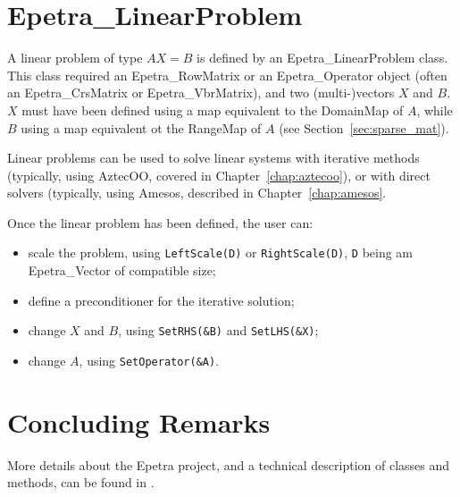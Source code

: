 
\section{Epetra\_LinearProblem}
\label{sec:linear_problem}

A linear problem of type $A X = B$ is defined by an
Epetra\_LinearProblem class. This class required an Epetra\_RowMatrix or
an Epetra\_Operator object (often an Epetra\_CrsMatrix or
Epetra\_VbrMatrix), and two (multi-)vectors $X$ and $B$. $X$ must have
been defined using a map equivalent to the DomainMap of $A$, while $B$
using a map equivalent ot the RangeMap of $A$ (see
Section~\ref{sec:sparse_mat}).

Linear problems can be used to solve linear systems with iterative
methods (typically, using AztecOO, covered in
Chapter~\ref{chap:aztecoo}), or with direct solvers (typically, using
Amesos, described in Chapter~\ref{chap:amesos}. 

Once the linear problem has been defined, the user can:

\begin{itemize}
\item scale the problem, using \verb!LeftScale(D)! or
  \verb!RightScale(D)!, \verb!D! being am Epetra\_Vector of compatible
  size;
\item define a preconditioner for the iterative solution;
\item change $X$ and $B$, using \verb!SetRHS(&B)! and \verb!SetLHS(&X)!;
\item change $A$, using \verb!SetOperator(&A)!.
\end{itemize}



\section{Concluding Remarks}
\label{sec:epetra_concluding}

More details about the Epetra project, and a technical description of
classes and methods, can be found in
\cite{Epetra-Ref-Guide,Epetra-Users-Guide}.

